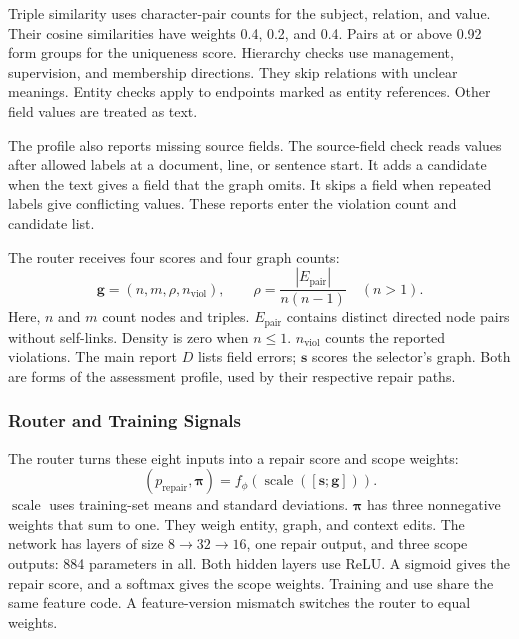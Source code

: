 Triple similarity uses character-pair counts for the subject, relation, and value.
Their cosine similarities have weights 0.4, 0.2, and 0.4.
Pairs at or above 0.92 form groups for the uniqueness score.
Hierarchy checks use management, supervision, and membership directions.
They skip relations with unclear meanings.
Entity checks apply to endpoints marked as entity references.
Other field values are treated as text.

The profile also reports missing source fields.
The source-field check reads values after allowed labels at a document,
line, or sentence start.
It adds a candidate when the text gives a field that the graph omits.
It skips a field when repeated labels give conflicting values.
These reports enter the violation count and candidate list.

The router receives four scores and four graph counts:
\begin{equation}
\label{eq:routing_inputs}
\mathbf{g}=(n,m,\rho,n_{\mathrm{viol}}),\qquad
\rho=\frac{|E_{\mathrm{pair}}|}{n(n-1)}\quad(n>1).
\end{equation}
Here, $n$ and $m$ count nodes and triples.
$E_{\mathrm{pair}}$ contains distinct directed node pairs without self-links.
Density is zero when $n\leq1$.
$n_{\mathrm{viol}}$ counts the reported violations.
The main report $D$ lists field errors; $\mathbf{s}$ scores the selector's graph.
Both are forms of the assessment profile, used by their respective repair paths.

\subsubsection{Router and Training Signals}

The router turns these eight inputs into a repair score and scope weights:
\begin{equation}
\label{eq:decision_net}
(p_{\mathrm{repair}},\boldsymbol{\pi})=
f_\phi(\operatorname{scale}([\mathbf{s};\mathbf{g}])).
\end{equation}
$\operatorname{scale}$ uses training-set means and standard deviations.
$\boldsymbol{\pi}$ has three nonnegative weights that sum to one.
They weigh entity, graph, and context edits.
The network has layers of size $8\!\rightarrow\!32\!\rightarrow\!16$,
one repair output, and three scope outputs: 884 parameters in all.
Both hidden layers use ReLU.
A sigmoid gives the repair score, and a softmax gives the scope weights.
Training and use share the same feature code.
A feature-version mismatch switches the router to equal weights.

